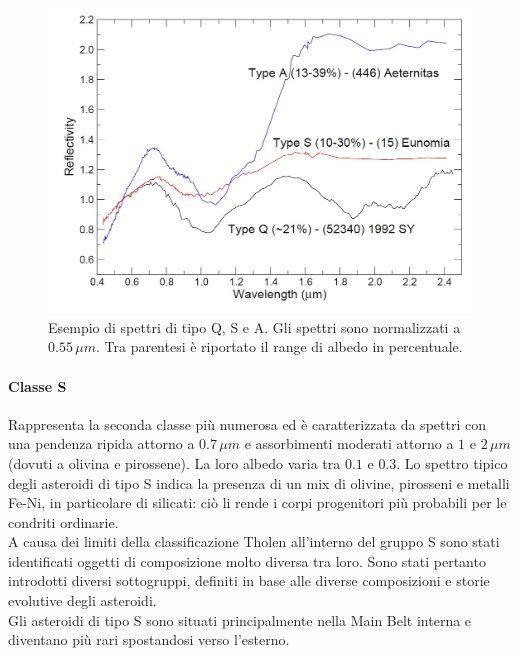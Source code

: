 \documentclass[a4paper,11pt,openright]{book}
\begin{document}
\begin{figure}
\centering
\includegraphics[scale=0.3]{figure/spettro_qsa.jpg}
\caption[Esempio di spettri di tipo Q, S e A.]{Esempio di spettri di tipo Q, S e A. Gli spettri sono normalizzati a $0.55\,\mu m$. Tra parentesi è riportato il range di albedo in percentuale. \citep{magrin_spectroscopic_nodate}}
\label{spettro_qsa}
\end{figure}

\paragraph*{Classe S}
Rappresenta la seconda classe più numerosa ed è caratterizzata da spettri con una pendenza ripida attorno a $0.7\,\mu m$ e assorbimenti moderati attorno a $1$ e $2\,\mu m$ (dovuti a olivina e pirossene). La loro albedo varia tra $0.1$ e $0.3$. Lo spettro tipico degli asteroidi di tipo S indica la presenza di un mix di olivine, pirosseni e metalli Fe-Ni, in particolare di silicati: ciò li rende i corpi progenitori più probabili per le condriti ordinarie.\\
A causa dei limiti della classificazione Tholen all’interno del gruppo S sono stati identificati oggetti di composizione molto diversa tra loro. Sono stati pertanto introdotti diversi sottogruppi, definiti in base alle diverse composizioni e storie evolutive degli asteroidi.\\
Gli asteroidi di tipo S sono situati principalmente nella Main Belt interna e diventano più rari spostandosi verso l'esterno.
\end{document}
